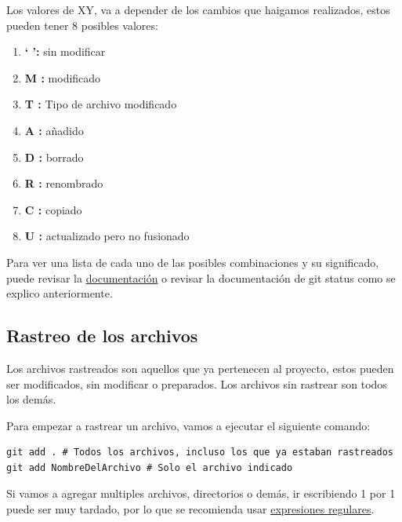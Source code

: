 Los valores de XY, va a depender de los cambios que haigamos realizados, estos pueden tener 8 posibles valores:

\begin{multicols}{2}
	\begin{enumerate}
		\item \textbf{` ':} sin modificar
		\item \textbf{M :} modificado
		\item \textbf{T :} Tipo de archivo modificado
		\item \textbf{A :} añadido
		\columnbreak
		\item \textbf{D : } borrado
		\item \textbf{R : } renombrado
		\item \textbf{C :} copiado
		\item \textbf{U :} actualizado pero no fusionado
	\end{enumerate}
\end{multicols}

Para ver una lista de cada uno de las posibles combinaciones y su significado, puede revisar la \href{https://git-scm.com/docs/git-status}{\textcolor{pucpRojo}{documentación}}
o revisar la documentación de git status como se explico anteriormente.

\subsection{Rastreo de los archivos}

Los archivos rastreados son aquellos que ya pertenecen al proyecto, estos pueden ser modificados, sin modificar o preparados. Los archivos sin rastrear son todos los demás.

Para empezar a rastrear un archivo, vamos a ejecutar el siguiente comando:

\begin{gitCode}
\begin{verbatim}
git add . # Todos los archivos, incluso los que ya estaban rastreados
git add NombreDelArchivo # Solo el archivo indicado
\end{verbatim}
\end{gitCode}

\begin{pucpImportant}
	Si vamos a agregar multiples archivos, directorios o demás, ir escribiendo 1 por 1 puede ser muy tardado, por lo que se recomienda usar
\href{https://berkeley-scf.github.io/tutorial-using-bash/regex.html}{\textcolor{pucpRojo}{expresiones regulares}}.
\end{pucpImportant}

